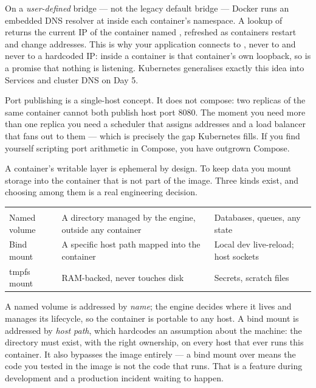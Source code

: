  On a \emph{user-defined} bridge --- not the legacy default bridge --- Docker runs an embedded DNS resolver at  inside each container's namespace. A lookup of  returns the current IP of the container named , refreshed as containers restart and change addresses. This is why your application connects to , never to  and never to a hardcoded IP:  inside a container is that container's own loopback, so  is a promise that nothing is listening. Kubernetes generalises exactly this idea into Services and cluster DNS on Day 5.

\begin{scalenote}
Port publishing is a single-host concept. It does not compose: two replicas of the same container cannot both publish host port 8080. The moment you need more than one replica you need a scheduler that assigns addresses and a load balancer that fans out to them --- which is precisely the gap Kubernetes fills. If you find yourself scripting port arithmetic in Compose, you have outgrown Compose.
\end{scalenote}


 A container's writable layer is ephemeral by design. To keep data you mount storage into the container that is not part of the image. Three kinds exist, and choosing among them is a real engineering decision.

\begin{center}\small
\wbrowcolors
\begin{tabularx}{\linewidth}{@{}L{24mm} X L{30mm}@{}}
 &  & \\
Named volume & A directory managed by the engine, outside any container & Databases, queues, any state\\
Bind mount & A specific host path mapped into the container & Local dev live-reload; host sockets\\
tmpfs mount & RAM-backed, never touches disk & Secrets, scratch files\\
\end{tabularx}
\end{center}

 A named volume is addressed by \emph{name}; the engine decides where it lives and manages its lifecycle, so the container is portable to any host. A bind mount is addressed by \emph{host path}, which hardcodes an assumption about the machine: the directory must exist, with the right ownership, on every host that ever runs this container. It also bypasses the image entirely --- a bind mount over  means the code you tested in the image is not the code that runs. That is a feature during development and a production incident waiting to happen.

